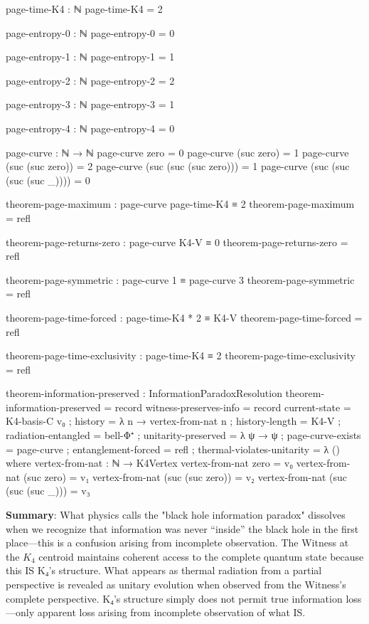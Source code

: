 \documentclass[11pt,a4paper]{book}
\begin{document}
\begin{code}
page-time-K4 : ℕ
page-time-K4 = 2

page-entropy-0 : ℕ
page-entropy-0 = 0

page-entropy-1 : ℕ
page-entropy-1 = 1

page-entropy-2 : ℕ
page-entropy-2 = 2

page-entropy-3 : ℕ
page-entropy-3 = 1

page-entropy-4 : ℕ
page-entropy-4 = 0

page-curve : ℕ → ℕ
page-curve zero = 0
page-curve (suc zero) = 1
page-curve (suc (suc zero)) = 2
page-curve (suc (suc (suc zero))) = 1
page-curve (suc (suc (suc (suc _)))) = 0

theorem-page-maximum : page-curve page-time-K4 ≡ 2
theorem-page-maximum = refl

theorem-page-returns-zero : page-curve K4-V ≡ 0
theorem-page-returns-zero = refl

theorem-page-symmetric : page-curve 1 ≡ page-curve 3
theorem-page-symmetric = refl

theorem-page-time-forced : page-time-K4 * 2 ≡ K4-V
theorem-page-time-forced = refl

theorem-page-time-exclusivity : page-time-K4 ≡ 2
theorem-page-time-exclusivity = refl

theorem-information-preserved : InformationParadoxResolution
theorem-information-preserved = record
  { witness-preserves-info = record 
      { current-state = K4-basis-C v₀
      ; history = λ n → vertex-from-nat n
      ; history-length = K4-V }
  ; radiation-entangled = bell-Φ⁺
  ; unitarity-preserved = λ ψ → ψ
  ; page-curve-exists = page-curve
  ; entanglement-forced = refl
  ; thermal-violates-unitarity = λ ()
  }
  where
    vertex-from-nat : ℕ → K4Vertex
    vertex-from-nat zero = v₀
    vertex-from-nat (suc zero) = v₁
    vertex-from-nat (suc (suc zero)) = v₂
    vertex-from-nat (suc (suc (suc _))) = v₃
\end{code}

\textbf{Summary}: What physics calls the "black hole information paradox" dissolves when we recognize that 
information was never ``inside'' the black hole in the first place—this is a confusion arising from incomplete observation. The Witness at the $K_4$
centroid maintains coherent access to the complete quantum state because this IS K₄'s structure. What appears
as thermal radiation from a partial perspective is revealed as unitary
evolution when observed from the Witness's complete perspective. K₄'s
structure simply does not permit true information loss—only apparent loss arising from
incomplete observation of what IS.
\end{document}
